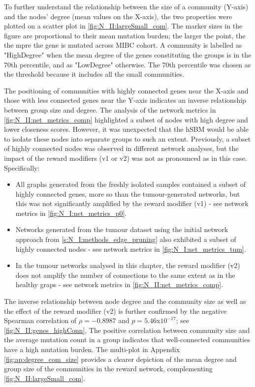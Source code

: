 To further understand the relationship between the size of a community (Y-axis) and the nodes' degree (mean values on the X-axis), the two properties were plotted on a scatter plot in \cref{fig:N_II:largeSmall_com}. The marker sizes in the figure are proportional to their mean mutation burden; the larger the point, the the mpre the gene is mutated across MIBC cohort. A community is labelled as "HighDegree" when the mean degree of the genes constituting the groups is in the 70th percentile, and as "LowDegree" otherwise. The 70th percentile was chosen as the threshold because it includes all the small communities.

The positioning of communities with highly connected genes near the X-axis and those with less connected genes near the Y-axis indicates an inverse relationship between group size and degree. The analysis of the network metrics in \cref{fig:N_II:net_metrics_comp} highlighted a subset of nodes with high degree and lower closeness scores. However, it was unexpected that the hSBM would be able to isolate these nodes into separate groups to such an extent. Previously, a subset of highly connected nodes was observed in different network analyses, but the impact of the reward modifiers (v1 or v2) was not as pronounced as in this case. Specifically:
\begin{itemize}
    \item All graphs generated from the freshly isolated samples contained a subset of highly connected genes, more so than the tumour-generated networks, but this was not significantly amplified by the reward modifier (v1) - see network metrics in \cref{fig:N_I:net_metrics_p0}.
    \item Networks generated from the tumour dataset using the initial network approach from \cref{s:N_I:methods_edge_pruning} also exhibited a subset of highly connected nodes - see network metrics in \cref{fig:N_I:net_metrics_tum}.
    \item In the tumour networks analysed in this chapter, the reward modifier (v2) does not amplify the number of connections to the same extent as in the healthy graps - see network metrics in \cref{fig:N_II:net_metrics_comp}.
\end{itemize}

The inverse relationship between node degree and the community size as well as the effect of the reward modifier (v2)  is further confirmed by the negative Spearman correlation of $\rho = -0.8987$ and $p = 5.46$x$10^{-17}$; see \cref{fig:N_II:genes_highConn}, The positive correlation between community size and the average mutation count in a group indicates that well-connected communities have a high mutation burden. The multi-plot in Appendix \cref{fig:ap:degree_com_size} provides a clearer depiction of the mean degree and group size of the communities in the reward network, complementing \cref{fig:N_II:largeSmall_com}.


